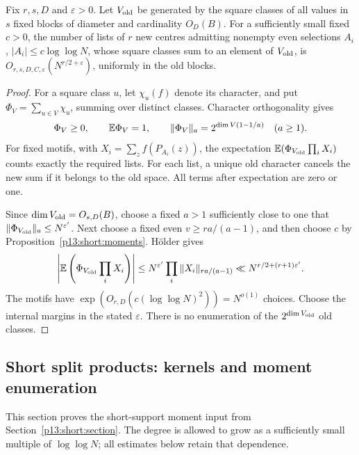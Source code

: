 \begin{corollary}
\label{p13:short:old-space}
Fix \(r,s,D\) and \(\varepsilon>0\). Let \(V_{\rm old}\)
be generated by the square classes of all values in \(s\)
fixed blocks of diameter and cardinality \(O_D(B)\).
For a sufficiently small fixed \(c>0\), the number of
lists of \(r\) new centres admitting nonempty even
selections \(A_i\), \(|A_i|\le c\log\log N\), whose
square classes sum to an element of \(V_{\rm old}\), is
\(O_{r,s,D,C,\varepsilon}(N^{r/2+\varepsilon})\),
uniformly in the old blocks.
\end{corollary}

\begin{proof}
For a square class \(u\), let \(\chi_u(f)\) denote its
character, and put \(\Phi_V=\sum_{u\in V}\chi_u\), summing
over distinct classes. Character orthogonality gives
\[
 \Phi_V\ge0,\qquad \mathbb E\Phi_V=1,\qquad
 \|\Phi_V\|_a=2^{\dim V(1-1/a)}\quad(a\ge1).
\]
For fixed motifs, with \(X_i=\sum_z f(P_{A_i}(z))\),
the expectation \(\mathbb E(\Phi_{V_{\rm old}}\prod_iX_i)\)
counts exactly the required lists. For each list, a unique
old character cancels the new sum if it belongs to the old
space. All terms after expectation are zero or one.

Since \(\dim V_{\rm old}=O_{s,D}(B)\), choose a fixed
\(a>1\) sufficiently close to one that
\(\|\Phi_{V_{\rm old}}\|_a\le N^{\varepsilon'}\).
Next choose a fixed even \(v\ge ra/(a-1)\), and then choose
\(c\) by Proposition~\ref{p13:short:moments}.
H\"older gives
\[
 \left|\mathbb E\left(\Phi_{V_{\rm old}}\prod_iX_i\right)\right|
 \le N^{\varepsilon'}\prod_i
       \|X_i\|_{ra/(a-1)}
 \ll N^{r/2+(r+1)\varepsilon'}.
\]
The motifs have
\(\exp(O_{r,D}(c(\log\log N)^2))=N^{o(1)}\) choices.
Choose the internal margins in the stated \(\varepsilon\).
There is no enumeration of the \(2^{\dim V_{\rm old}}\)
old classes.
\end{proof}

\subsection{Short split products: kernels and moment enumeration}
\label{p14:comp:short}

This section proves the short-support moment input from
Section~\ref{p13:short:section}.  The degree is allowed to grow as a
sufficiently small multiple of $\log\log N$; all estimates below
retain that dependence.

